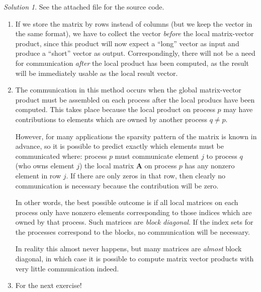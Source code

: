 \documentclass[onecolumn, oneside, a4paper, 11pt]{memoir}
\theoremstyle{remark}
\newtheorem*{sol}{Solution}
\begin{document}
\begin{sol}
  See the attached file for the source code.

  \begin{enumerate}
  \item If we store the matrix by rows instead of columns (but we keep the
    vector in the same format), we have to collect the vector \emph{before} the
    local matrix-vector product, since this product will now expect a ``long''
    vector as input and produce a ``short'' vector as output. Correspondingly,
    there will not be a need for communication \emph{after} the local product
    has been computed, as the result will be immediately usable as the local
    result vector.
  \item The communication in this method occurs when the global matrix-vector
    product must be assembled on each process after the local producs have been
    computed. This takes place because the local product on process $p$ may have
    contributions to elements which are owned by another process $q \not= p$.

    However, for many applications the sparsity pattern of the matrix is known
    in advance, so it is possible to predict exactly which elements must be
    communicated where: process $p$ must communicate element $j$ to process $q$
    (who owns element $j$) the local matrix $\bm A$ on process $p$ has any
    nonzero element in row $j$. If there are only zeros in that row, then
    clearly no communication is necessary because the contribution will be zero.

    In other words, the best possible outcome is if all local matrices on each
    process only have nonzero elements corresponding to those indices which are
    owned by that process. Such matrices are \emph{block diagonal}. If the index
    sets for the processes correspond to the blocks, no communication will be
    necessary.

    In reality this almost never happens, but many matrices are \emph{almost}
    block diagonal, in which case it is possible to compute matrix vector
    products with very little communication indeed.
  \item For the next exercise!
  \end{enumerate}
\end{sol}
\end{document}
